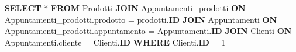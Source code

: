 \documentclass[]{article}
\newenvironment{Shaded}{}{}
\newcommand{\DecValTok}[1]{\textcolor[rgb]{0.25,0.63,0.44}{#1}}
\newcommand{\KeywordTok}[1]{\textcolor[rgb]{0.00,0.44,0.13}{\textbf{#1}}}
\newcommand{\NormalTok}[1]{#1}
\newcommand{\OperatorTok}[1]{\textcolor[rgb]{0.40,0.40,0.40}{#1}}
\begin{document}
\begin{Shaded}
\begin{Highlighting}[]
\KeywordTok{SELECT} \OperatorTok{*}
\KeywordTok{FROM}\NormalTok{ Prodotti}
\KeywordTok{JOIN}\NormalTok{ Appuntamenti_prodotti}
\KeywordTok{ON}\NormalTok{ Appuntamenti_prodotti.prodotto }\OperatorTok{=}\NormalTok{ prodotti.}\KeywordTok{ID}
\KeywordTok{JOIN}\NormalTok{ Appuntamenti}
\KeywordTok{ON}\NormalTok{ Appuntamenti_prodotti.appuntamento }\OperatorTok{=}\NormalTok{ Appuntamenti.}\KeywordTok{ID}
\KeywordTok{JOIN}\NormalTok{ Clienti}
\KeywordTok{ON}\NormalTok{ Appuntamenti.cliente }\OperatorTok{=}\NormalTok{ Clienti.}\KeywordTok{ID}
\KeywordTok{WHERE}\NormalTok{ Clienti.}\KeywordTok{ID} \OperatorTok{=} \DecValTok{1}
\end{Highlighting}
\end{Shaded}
\end{document}
